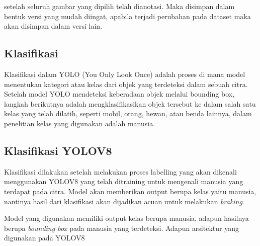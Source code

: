 setelah seluruh gambar yang dipilih telah dianotasi. Maka disimpan dalam bentuk versi yang mudah diingat, apabila terjadi perubahan pada dataset maka akan disimpan dalam versi lain.


\subsection{Klasifikasi}
Klasifikasi dalam YOLO (You Only Look Once) adalah proses di mana model menentukan kategori atau kelas dari objek yang terdeteksi dalam sebuah citra. Setelah model YOLO mendeteksi keberadaan objek melalui bounding box, langkah berikutnya adalah mengklasifikasikan objek tersebut ke dalam salah satu kelas yang telah dilatih, seperti mobil, orang, hewan, atau benda lainnya, dalam penelitian kelas yang digunakan adalah manusia.


\subsection{Klasifikasi YOLOV8}
Klasifikasi dilakukan setelah melakukan proses labelling yang akan dikenali menggunakan YOLOV8 yang telah ditraining untuk mengenali manusia yang terdapat pada citra. Model akan memberikan output berupa kelas yaitu manusia, nantinya hasil dari klasifikasi akan dijadikan acuan untuk melakukan \emph{braking}.

Model yang digunakan memiliki output kelas berupa manusia, adapun hasilnya berupa \emph{bounding box} pada manusia yang terdeteksi. Adapun arsitektur yang digunakan pada YOLOV8 

